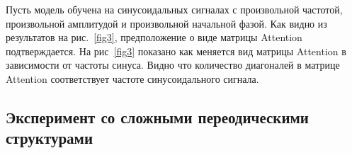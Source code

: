 \documentclass[11pt, a4paper]{article}
\begin{document}
Пусть модель обучена на синусоидальных сигналах с произвольной частотой, произвольной амплитудой и произвольной начальной фазой. Как видно из результатов на рис.~\ref{fig3}, предположение о виде матрицы Attention подтверждается. На рис~\ref{fig3} показано как меняется вид матрицы Attention в зависимости от частоты синуса. Видно что количество диагоналей в матрице Attention соответствует частоте синусоидального сигнала.

\subsection{Эксперимент со сложными переодическими структурами}
\end{document}
